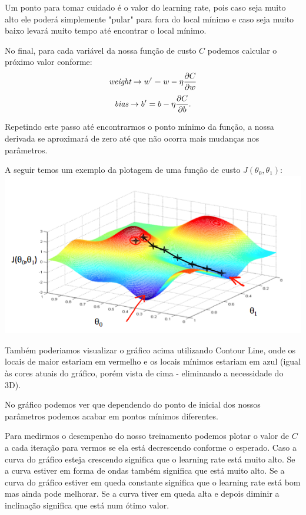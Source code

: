 \documentclass[11pt,a4paper,leqno]{article}
\begin{document}
Um ponto para tomar cuidado é o valor do learning rate, pois caso seja muito alto ele poderá simplemente "pular" para fora do local mínimo e caso seja muito baixo levará muito tempo até encontrar o local mínimo.

No final, para cada variável da nossa função de custo $C$ podemos calcular o próximo valor conforme:
\[
  \emph{weight} \rightarrow w' = w-\eta \frac{\partial C}{\partial w}
\]
\[
  \emph{bias} \rightarrow b' = b-\eta \frac{\partial C}{\partial b}.
\]

Repetindo este passo até encontrarmos o ponto mínimo da função, a nossa derivada se aproximará de zero até que não ocorra mais mudanças nos parâmetros.

A seguir temos um exemplo da plotagem de uma função de custo $J(\theta_0, \theta_1)$:\\
\includegraphics[scale=0.5]{Images/gradiente_descendente.png}

Também poderiamos visualizar o gráfico acima utilizando Contour Line, onde os locais de maior estariam em vermelho e os locais mínimos estariam em azul (igual às cores atuais do gráfico, porém vista de cima - eliminando a necessidade do 3D).

No gráfico podemos ver que dependendo do ponto de inicial dos nossos parâmetros podemos acabar em pontos mínimos diferentes.

Para medirmos o desempenho do nosso treinamento podemos plotar o valor de $C$ a cada iteração para vermos se ela está decrescendo conforme o esperado. Caso a curva do gráfico esteja crescendo significa que o learning rate está muito alto. Se a curva estiver em forma de ondas também significa que está muito alto. Se a curva do gráfico estiver em queda constante significa que o learning rate está bom mas ainda pode melhorar. Se a curva tiver em queda alta e depois diminir a inclinação significa que está num ótimo valor.
\end{document}
